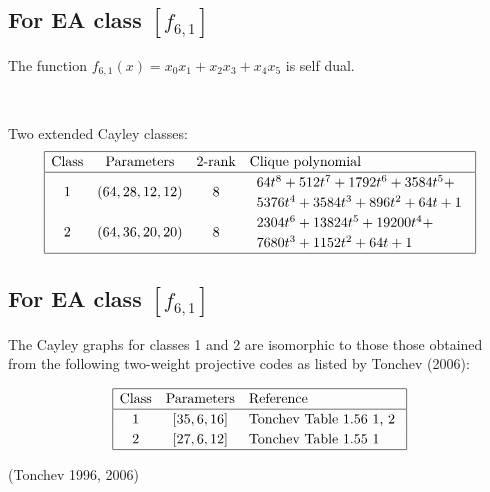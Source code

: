 \documentclass[12pt,a4paper]{article}
\newcommand{\slidecite}[1]{\tiny{(#1)}\normalsize{}}
\begin{document}
\subsection*{For EA class $[f_{6,1}]$}

The function
$f_{6,1}(x) = x_0 x_1 + x_2 x_3 + x_4 x_5$ is self dual.

~

Two extended Cayley classes:
\small{}
\begin{align*}
\def\arraystretch{1.2}
\begin{array}{|cccl|}
\hline
\text{Class} &
\text{Parameters} & 
\text{2-rank} &
\text{Clique polynomial}
\\
\hline
1 &
(64, 28, 12, 12) & 8 & 
\begin{array}{l}
64t^{8} + 512t^{7} + 1792t^{6} + 3584t^{5} +
\\
5376t^{4} + 3584t^{3} + 896t^{2} + 64t + 1
\end{array}
\\
2 &
(64, 36, 20, 20) & 8 & 
\begin{array}{l}
2304t^{6} + 13824t^{5} + 19200t^{4} + 
\\
7680t^{3} + 1152t^{2} + 64t + 1
\end{array}
\\
\hline
\end{array}
\end{align*}
\subsection*{For EA class $[f_{6,1}]$}

The Cayley graphs for classes 1 and 2 are isomorphic to those those obtained from the following two-weight projective
codes as listed by Tonchev (2006):

\begin{align*}
\begin{array}{|ccl|}
\hline
\text{Class} &
\text{Parameters} & \text{Reference}
\\
\hline
1 & [35,6,16] & \text{Tonchev Table 1.56 1, 2 }
\\
2 & [27,6,12] & \text{Tonchev Table 1.55 1 }
\\
\hline
\end{array}
\end{align*}

\slidecite{Tonchev 1996, 2006}
\end{document}

